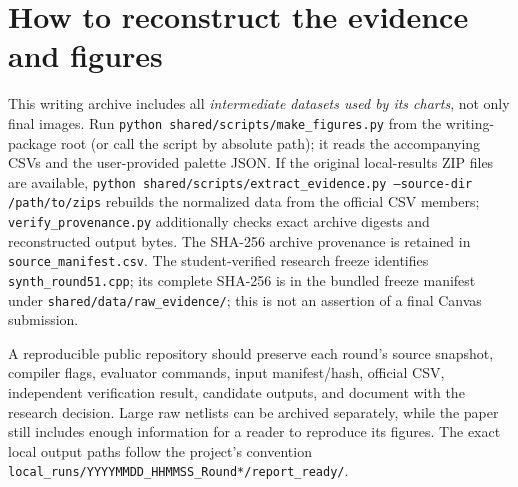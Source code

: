 \documentclass[a4paper,10pt]{article}
\theoremstyle{definition}
\theoremstyle{remark}
\begin{document}
\section{How to reconstruct the evidence and figures}
This writing archive includes all \emph{intermediate datasets used by its charts}, not only final images. Run \texttt{python shared/scripts/make\_figures.py} from the writing-package root (or call the script by absolute path); it reads the accompanying CSVs and the user-provided palette JSON. If the original local-results ZIP files are available, \texttt{python shared/scripts/extract\_evidence.py --source-dir /path/to/zips} rebuilds the normalized data from the official CSV members; \texttt{verify\_provenance.py} additionally checks exact archive digests and reconstructed output bytes. The SHA-256 archive provenance is retained in \texttt{source\_manifest.csv}. The student-verified research freeze identifies \texttt{synth\_round51.cpp}; its complete SHA-256 is in the bundled freeze manifest under \texttt{shared/data/raw\_evidence/}; this is not an assertion of a final Canvas submission.

A reproducible public repository should preserve each round's source snapshot, compiler flags, evaluator commands, input manifest/hash, official CSV, independent verification result, candidate outputs, and document with the research decision. Large raw netlists can be archived separately, while the paper still includes enough information for a reader to reproduce its figures. The exact local output paths follow the project's convention \texttt{local\_runs/YYYYMMDD\_HHMMSS\_Round*/report\_ready/}.
\end{document}
